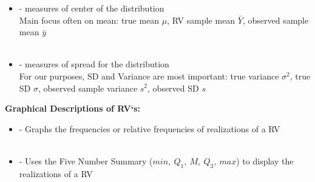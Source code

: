 \begin{itemize}
\begin{itemize}
\begin{center}
\end{center}~\\
\item %
\underbar{~~~~~~~~~~~~~~~~~~~~~~~~~~~~~~~~~~~~~~~~~~~~~~~~~}
- measures of center of the distribution\\
Main focus often on mean: true mean $\mu$, RV sample mean $\bar{Y}$, observed sample mean $\bar{y}$\\~\\
\item 
\underbar{~~~~~~~~~~~~~~~~~~~~~~~~~~~~~~~~~~~~~~~~~~~~~~~~}
- measures of spread for the distribution\\
For our purposes, SD and Variance are most important: true variance $\sigma^2$, true SD $\sigma$, observed sample variance $s^2$, observed SD $s$
\end{itemize}
\end{itemize}

\Large \textbf{Graphical Descriptions of RV`s:}\large\\
\begin{itemize}
\item 
\underbar{~~~~~~~~~~~~~~~~~~~~~~~~~~~~~~~~~~~~~~~}
- Graphs the frequencies or relative frequencies of realizations of a RV\\~\\
\item 
\underbar{~~~~~~~~~~~~~~~~~~~~~~~~~~~~~~~~~~~~~~~}
- Uses the Five Number Summary ($min,~Q_1,~M,~Q_3,~max$) to display the realizations of a RV
\end{itemize}

